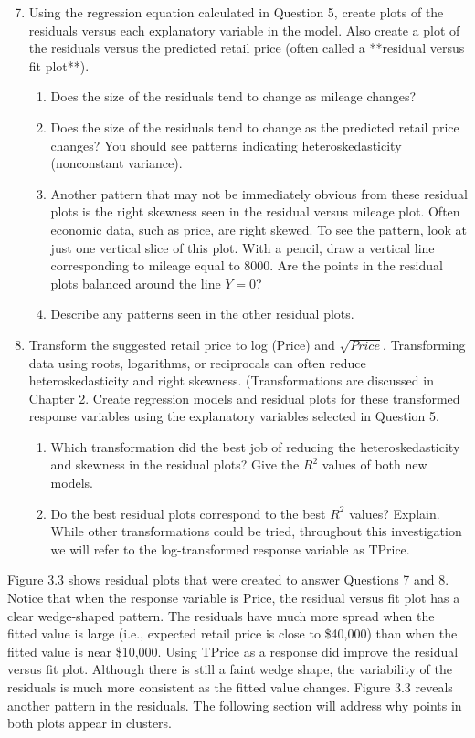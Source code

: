 \documentclass[
]{report}
\begin{document}
\begin{enumerate}
 \setcounter{enumi}{6}
 \item Using the regression equation calculated in Question 5, create plots of the residuals versus each explanatory variable in the model. Also create a plot of the residuals versus the predicted retail price (often called a **residual versus fit plot**).
 \begin{enumerate}
 \item Does the size of the residuals tend to change as mileage changes?
 \item Does the size of the residuals tend to change as the predicted retail price changes? You should see patterns indicating heteroskedasticity (nonconstant variance).
 \item Another pattern that may not be immediately obvious from these residual plots is the right skewness seen in the residual versus mileage plot. Often economic data, such as price, are right skewed. To see the pattern, look at just one vertical slice of this plot. With a pencil, draw a vertical line corresponding to mileage equal to 8000. Are the points in the residual plots balanced around the line $\scriptstyle Y = 0$?
 \item Describe any patterns seen in the other residual plots.
 \end{enumerate}
\item Transform the suggested retail price to log (Price) and $\scriptstyle \sqrt{Price}$. Transforming data using roots, logarithms, or reciprocals can often reduce heteroskedasticity and right skewness. (Transformations are discussed in Chapter 2. Create regression models and residual plots for these transformed response variables using the explanatory variables selected in Question 5.
\begin{enumerate}
 \item Which transformation did the best job of reducing the heteroskedasticity and skewness in the residual plots? Give the $\scriptstyle {R}^2$ values of both new models.
 \item Do the best residual plots correspond to the best $\scriptstyle {R}^2$ values? Explain.
While other transformations could be tried, throughout this investigation we will refer to the log-transformed response variable as TPrice.
\end{enumerate}
\end{enumerate}

Figure 3.3 shows residual plots that were created to answer Questions 7 and 8. Notice that when the response variable is Price, the residual versus fit plot has a clear wedge-shaped pattern. The residuals have much more spread when the fitted value is large (i.e., expected retail price is close to \$40,000) than when the fitted value is near \$10,000. Using TPrice as a response did improve the residual versus fit plot. Although
there is still a faint wedge shape, the variability of the residuals is much more consistent as the fitted value changes. Figure 3.3 reveals another pattern in the residuals. The following section will address why points in both plots appear in clusters.
\end{document}
